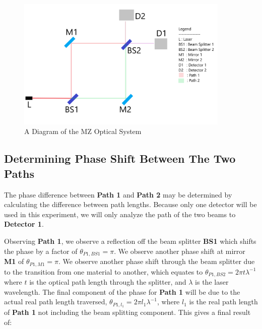 \documentclass{article}
\begin{document}
\begin{figure}[h]
    \centering
    \includegraphics[width=4in]{images_theory/mz_diagram_theory.png}
    \caption{A Diagram of the MZ Optical System}
    \label{fig:mz_diagram_theory}
\end{figure}



\clearpage

\subsection{  Determining Phase Shift Between The Two Paths }\label{sec:determining_phase_shift_between_the_two_paths }\label{subsec:_determining_phase_shift_between_the_two_paths_}\label{sec:determining_phase_shift_between_the_two_paths}
The phase difference between \textbf{Path 1} and \textbf{Path 2} may be determined by calculating the difference between path lengths\cite[pg. 48]{Zetie_2000}. Because only one detector
will be used in this experiment, we will only analyze the path of the two beams to \textbf{Detector 1}.
\par
Observing \textbf{Path 1},
we observe a reflection off the beam splitter \textbf{BS1} which shifts the phase by a factor of $\theta_{P1,BS1} = \pi$. We observe another phase shift at
mirror \textbf{M1} of $\theta_{P1,M1} = \pi$. We observe another phase shift through the beam splitter due to the transition from one material to another,
which equates to $\theta_{P1,BS2} = 2\pi{t}\lambda^{-1}$ where $t$ is the optical path length through the splitter, and $\lambda$ is the laser wavelength.
The final component of the phase for \textbf{Path 1} will be due to the actual real path length traversed, $\theta_{P1,l_1} = 2\pi{l_1}\lambda^{-1}$, where
$l_1$ is the real path length of \textbf{Path 1} not including the beam splitting component. This gives a final result of\cite[pg. 48]{Zetie_2000}:
\end{document}
